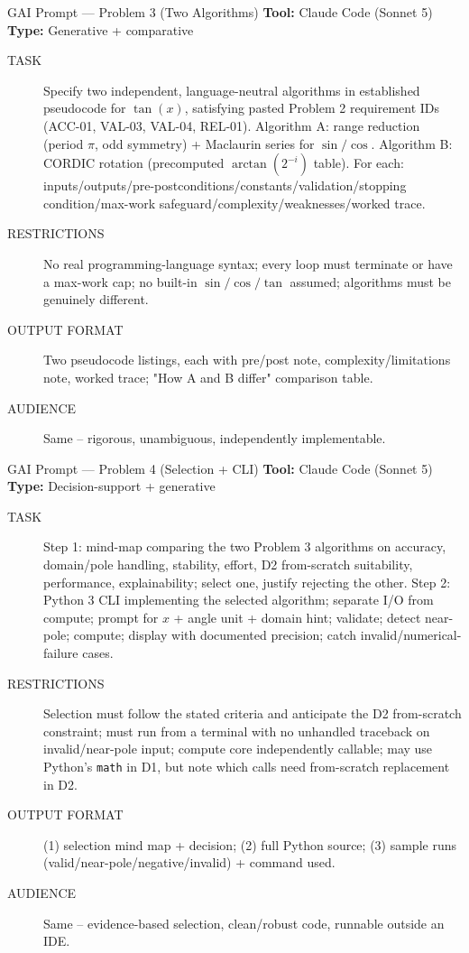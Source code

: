 \documentclass[10pt]{beamer}
\begin{document}
\begin{frame}{GAI Prompt --- Problem 3 (Two Algorithms)}
  \footnotesize
  \textbf{Tool:} Claude Code (Sonnet 5) \quad \textbf{Type:} Generative + comparative
  \begin{description}
    \item[TASK] Specify two independent, language-neutral algorithms in established pseudocode for $\tan(x)$, satisfying pasted Problem 2 requirement IDs (ACC-01, VAL-03, VAL-04, REL-01). Algorithm A: range reduction (period $\pi$, odd symmetry) + Maclaurin series for $\sin/\cos$. Algorithm B: CORDIC rotation (precomputed $\arctan(2^{-i})$ table). For each: inputs/outputs/pre-postconditions/constants/validation/stopping condition/max-work safeguard/complexity/weaknesses/worked trace.
    \item[RESTRICTIONS] No real programming-language syntax; every loop must terminate or have a max-work cap; no built-in $\sin/\cos/\tan$ assumed; algorithms must be genuinely different.
    \item[OUTPUT FORMAT] Two pseudocode listings, each with pre/post note, complexity/limitations note, worked trace; "How A and B differ" comparison table.
    \item[AUDIENCE] Same -- rigorous, unambiguous, independently implementable.
  \end{description}
\end{frame}

\begin{frame}{GAI Prompt --- Problem 4 (Selection + CLI)}
  \footnotesize
  \textbf{Tool:} Claude Code (Sonnet 5) \quad \textbf{Type:} Decision-support + generative
  \begin{description}
    \item[TASK] Step 1: mind-map comparing the two Problem 3 algorithms on accuracy, domain/pole handling, stability, effort, D2 from-scratch suitability, performance, explainability; select one, justify rejecting the other. Step 2: Python 3 CLI implementing the selected algorithm; separate I/O from compute; prompt for $x$ + angle unit + domain hint; validate; detect near-pole; compute; display with documented precision; catch invalid/numerical-failure cases.
    \item[RESTRICTIONS] Selection must follow the stated criteria and anticipate the D2 from-scratch constraint; must run from a terminal with no unhandled traceback on invalid/near-pole input; compute core independently callable; may use Python's \texttt{math} in D1, but note which calls need from-scratch replacement in D2.
    \item[OUTPUT FORMAT] (1) selection mind map + decision; (2) full Python source; (3) sample runs (valid/near-pole/negative/invalid) + command used.
    \item[AUDIENCE] Same -- evidence-based selection, clean/robust code, runnable outside an IDE.
  \end{description}
\end{frame}
\end{document}

